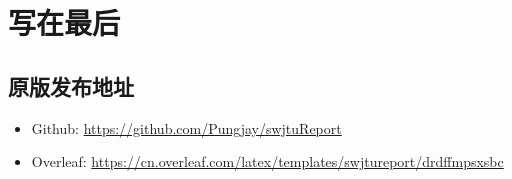 \section{写在最后}
\subsection{原版发布地址}
\begin{itemize}
    \item Github: 
    \url{https://github.com/Pungjay/swjtuReport}
    \item Overleaf:  \url{https://cn.overleaf.com/latex/templates/swjtureport/drdffmpsxsbc}
\end{itemize}